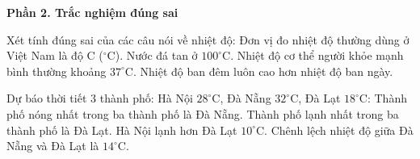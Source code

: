 \textbf{Phần 2. Trắc nghiệm đúng sai}

\begin{ex} %
Xét tính đúng sai của các câu nói về nhiệt độ:
\choiceTF
{\True Đơn vị đo nhiệt độ thường dùng ở Việt Nam là độ C ($^\circ\text{C}$).}
{Nước đá tan ở $100^\circ\text{C}$.}
{\True Nhiệt độ cơ thể người khỏe mạnh bình thường khoảng $37^\circ\text{C}$.}
{Nhiệt độ ban đêm luôn cao hơn nhiệt độ ban ngày.}
\end{ex}

\begin{ex} %
Dự báo thời tiết 3 thành phố: Hà Nội $28^\circ\text{C}$, Đà Nẵng $32^\circ\text{C}$, Đà Lạt $18^\circ\text{C}$:
\choiceTF
{\True Thành phố nóng nhất trong ba thành phố là Đà Nẵng.}
{\True Thành phố lạnh nhất trong ba thành phố là Đà Lạt.}
{Hà Nội lạnh hơn Đà Lạt $10^\circ\text{C}$.}
{\True Chênh lệch nhiệt độ giữa Đà Nẵng và Đà Lạt là $14^\circ\text{C}$.}
\end{ex}

